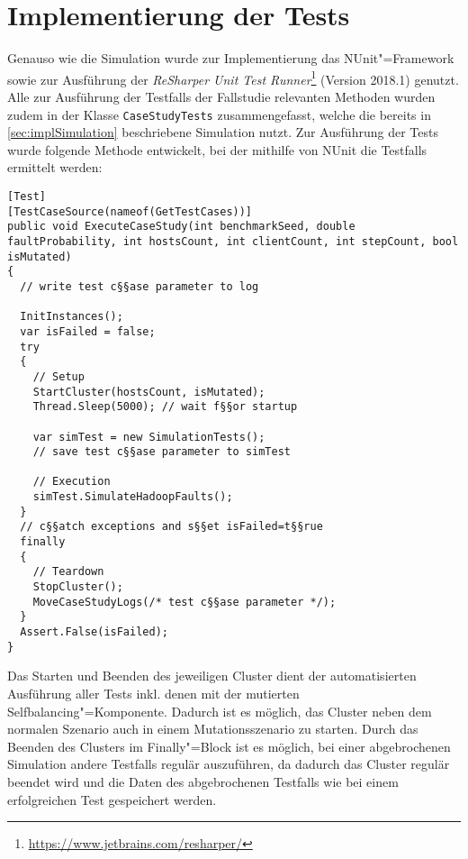 \section{Implementierung der Tests}
\label{sec:implTestcases}

Genauso wie die Simulation wurde zur Implementierung das NUnit"=Framework sowie zur Ausführung der \emph{ReSharper Unit \gls{Test} Runner}\footnote{\url{https://www.jetbrains.com/resharper/}} (Version 2018.1) genutzt.
Alle zur Ausführung der \glspl{Testfall} der Fallstudie relevanten Methoden wurden zudem in der Klasse \texttt{CaseStudyTests} zusammengefasst, welche die bereits in \cref{sec:implSimulation} beschriebene Simulation nutzt.
Zur Ausführung der \glspl{Test} wurde folgende Methode entwickelt, bei der mithilfe von NUnit die \glspl{Testfall} ermittelt werden:

\begin{lstlisting}[label=lst:executeTestCases,style=cs,
caption={[Methode zur Ausführung der Testfälle]
    Methode zur Ausführung der \glspl{Testfall} (gekürzt)}]
[Test]
[TestCaseSource(nameof(GetTestCases))]
public void ExecuteCaseStudy(int benchmarkSeed, double faultProbability, int hostsCount, int clientCount, int stepCount, bool isMutated)
{
  // write test c§§ase parameter to log
  
  InitInstances();
  var isFailed = false;
  try
  {
    // Setup
    StartCluster(hostsCount, isMutated);
    Thread.Sleep(5000); // wait f§§or startup
    
    var simTest = new SimulationTests();
    // save test c§§ase parameter to simTest
    
    // Execution
    simTest.SimulateHadoopFaults();
  }
  // c§§atch exceptions and s§§et isFailed=t§§rue
  finally
  {
    // Teardown
    StopCluster();
    MoveCaseStudyLogs(/* test c§§ase parameter */);
  }
  Assert.False(isFailed);
}
\end{lstlisting}

Das Starten und Beenden des jeweiligen Cluster dient der automatisierten Ausführung aller \glspl{Test} inkl. denen mit der mutierten Selfbalancing"=Komponente.
Dadurch ist es möglich, das Cluster neben dem normalen Szenario auch in einem Mutationsszenario zu starten.
Durch das Beenden des Clusters im Finally"=Block ist es möglich, bei einer abgebrochenen Simulation andere \glspl{Testfall} regulär auszuführen, da dadurch das Cluster regulär beendet wird und die Daten des abgebrochenen Testfalls wie bei einem erfolgreichen \gls{Test} gespeichert werden.

